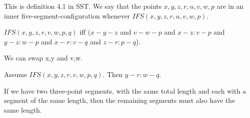 \documentclass{article}
\begin{document}
  This is definition 4.1 in SST. We say that the points $x,y,z,r,u,v,w,p$ are in an inner five-segment-configuration whenever $IFS(x,y,z,r,u,v,w,p)$.

  \begin{forthel}
    \begin{definition}[IFS]
      $IFS(x,y,z,r,v,w,p,q)$ iff ($x-y-z$ and $v-w-p$ and $x-z : v-p$ and $y-z : w-p$ and $x-r : v-q$ and $z-r : p-q$).
    \end{definition}
  \end{forthel}

  We can swap x,y and v,w.

  \begin{forthel}
    \begin{axiom}[L4_2]
      Assume $IFS(x,y,z,r,v,w,p,q)$. Then $y-r : w-q$.
    \end{axiom}
  \end{forthel}

  If we have two three-point segments, with the same total length and each with a segment of the same length, then the remaining segments must also have the same length.

\end{document}

